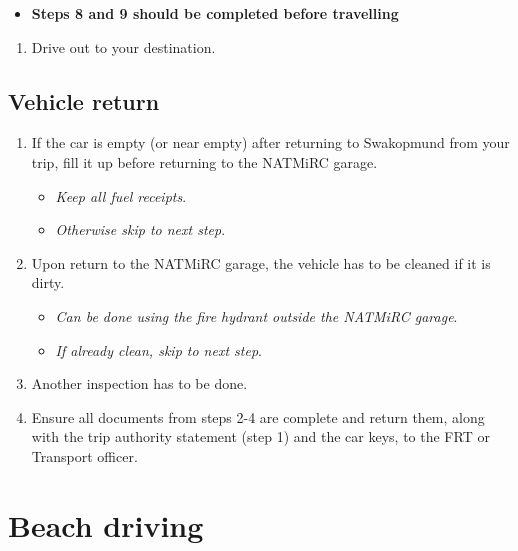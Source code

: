 \documentclass[
  12pt,
]{report}
\providecommand{\tightlist}{%
  \setlength{\itemsep}{0pt}\setlength{\parskip}{0pt}}\usepackage{longtable,booktabs,array}
\begin{document}
\begin{itemize}
\tightlist
\item
  \textbf{Steps 8 and 9 should be completed before travelling}
\end{itemize}

\begin{enumerate}
\def\labelenumi{\arabic{enumi}.}
\setcounter{enumi}{9}
\tightlist
\item
  Drive out to your destination.
\end{enumerate}

\hypertarget{sec-vehicle-return}{%
\subsection{Vehicle return}\label{sec-vehicle-return}}

\begin{enumerate}
\def\labelenumi{\arabic{enumi}.}
\setcounter{enumi}{10}
\tightlist
\item
  If the car is empty (or near empty) after returning to Swakopmund from
  your trip, fill it up before returning to the NATMiRC garage.

  \begin{itemize}
  \tightlist
  \item
    \emph{Keep all fuel receipts}.
  \item
    \emph{Otherwise skip to next step}.
  \end{itemize}
\item
  Upon return to the NATMiRC garage, the vehicle has to be cleaned if it
  is dirty.

  \begin{itemize}
  \tightlist
  \item
    \emph{Can be done using the fire hydrant outside the NATMiRC
    garage}.
  \item
    \emph{If already clean, skip to next step}.
  \end{itemize}
\item
  Another inspection has to be done.
\item
  Ensure all documents from steps 2-4 are complete and return them,
  along with the trip authority statement (step 1) and the car keys, to
  the FRT or Transport officer.
\end{enumerate}

\hypertarget{beach-driving}{%
\section{Beach driving}\label{beach-driving}}
\end{document}
